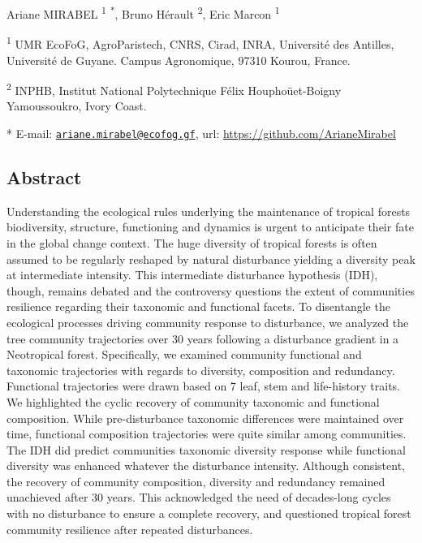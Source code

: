 \documentclass[
  11pt,
  french,
  A4paper,
  extrafontsizes,onecolumn,openright
  ]{memoir}
\begin{document}
Ariane MIRABEL \textsuperscript{1} \textsuperscript{*}, Bruno Hérault
\textsuperscript{2}, Eric Marcon \textsuperscript{1} \newline

\textsuperscript{1} UMR EcoFoG, AgroParistech, CNRS, Cirad, INRA,
Université des Antilles, Université de Guyane. Campus Agronomique, 97310
Kourou, France.

\textsuperscript{2} INPHB, Institut National Polytechnique Félix
Houphoüet-Boigny Yamoussoukro, Ivory Coast. \newline

* E-mail:
\href{mailto:ariane.mirabel@ecofog.gf}{\nolinkurl{ariane.mirabel@ecofog.gf}},
url: \url{https://github.com/ArianeMirabel}

\subsection{Abstract}\label{abstract-1}

Understanding the ecological rules underlying the maintenance of
tropical forests biodiversity, structure, functioning and dynamics is
urgent to anticipate their fate in the global change context. The huge
diversity of tropical forests is often assumed to be regularly reshaped
by natural disturbance yielding a diversity peak at intermediate
intensity. This intermediate disturbance hypothesis (IDH), though,
remains debated and the controversy questions the extent of communities
resilience regarding their taxonomic and functional facets. To
disentangle the ecological processes driving community response to
disturbance, we analyzed the tree community trajectories over 30 years
following a disturbance gradient in a Neotropical forest. Specifically,
we examined community functional and taxonomic trajectories with regards
to diversity, composition and redundancy. Functional trajectories were
drawn based on 7 leaf, stem and life-history traits. We highlighted the
cyclic recovery of community taxonomic and functional composition. While
pre-disturbance taxonomic differences were maintained over time,
functional composition trajectories were quite similar among
communities. The IDH did predict communities taxonomic diversity
response while functional diversity was enhanced whatever the
disturbance intensity. Although consistent, the recovery of community
composition, diversity and redundancy remained unachieved after 30
years. This acknowledged the need of decades-long cycles with no
disturbance to ensure a complete recovery, and questioned tropical
forest community resilience after repeated disturbances.
\end{document}
